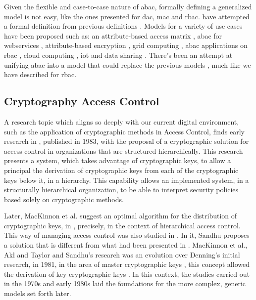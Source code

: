 Given the flexible and case-to-case nature of \gls{abac}, formally defining a generalized model is not easy, like the ones presented for \gls{dac}, \gls{mac} and \gls{rbac}. \citeauthor{hu_guide_2014} have attempted a formal definition from previous definitions \cite{wang_logic-based_2004, yuan_attributed_2005, cruz_constraint_2009}. Models for a variety of use cases have been proposed such as: an attribute-based access matrix \cite{zhang_attribute-based_2005}, \gls{abac} for webservices \cite{yuan_attributed_2005}, attribute-based encryption \cite{goyal_attribute-based_2006, wang_hierarchical_2010}, grid computing \cite{lang_flexible_2009}, \gls{abac} applications on \gls{rbac} \cite{kuhn_adding_2010}, cloud computing \cite{wan_hasbe:_2012, yang_attribute-based_2013}, \gls{iot} \cite{bhatt_access_2017, ouaddah_access_2017} and data sharing \cite{yu_attribute_2010}. There's been an attempt at unifying \gls{abac} into a model that could replace the previous models \cite{jin_unified_2012}, much like we have described for \gls{rbac}.

\subsection{Cryptography Access Control}

A research topic which aligns so deeply with our current digital environment, such as the application of cryptographic methods in Access Control, finds early research in \cite{akl_cryptographic_1983}, published in 1983, with the proposal of a cryptographic solution for access control in organizations that are structured hierarchically. This research presents a system, which takes advantage of cryptographic keys, to allow a principal the derivation of cryptographic keys from each of the cryptographic keys below it, in a hierarchy. This capability allows an implemented system, in a structurally hierarchical organization, to be able to interpret security policies based solely on cryptographic methods.

Later, MacKinnon et al. suggest an optimal algorithm for the distribution of cryptographic keys, in \cite{mackinnon_optimal_1985}, precisely, in the context of hierarchical access control. This way of managing access control was also studied in \cite{sandhu_cryptographic_1988}. In it, Sandhu proposes a solution that is different from what had been presented in \cite{akl_cryptographic_1983}. MacKinnon et al., Akl and Taylor and Sandhu's research was an evolution over Denning's initial research, in 1981, in the area of master cryptographic keys \cite{denning_master_1981}, this concept allowed the derivation of key cryptographic keys . In this context, the studies carried out in the 1970s and early 1980s laid the foundations for the more complex, generic models set forth later.

